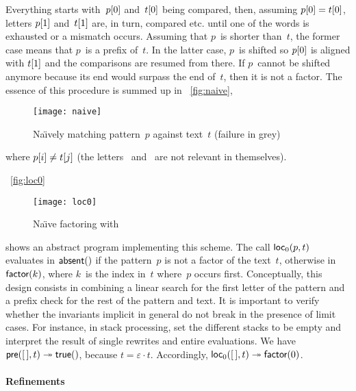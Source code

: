 Everything starts with~\({p}[{0}]\) and~\({t}[{0}]\) being
compared, then, assuming \({p}[{0}] = {t}[{0}]\), letters
\({p}[{1}]\) and~\({t}[{1}]\) are, in turn, compared etc. until
one of the words is exhausted or a mismatch occurs. Assuming that
\(p\)~is shorter than~\(t\), the former case means that \(p\)~is a
prefix of~\(t\). In the latter case, \(p\)~is shifted so
\({p}[{0}]\) is aligned with \({t}[{1}]\) and the comparisons are
resumed from there. If \(p\)~cannot be shifted anymore because its end
would surpass the end of~\(t\), then it is not a factor. The essence
of this procedure is summed up in \fig~\vref{fig:naive},
\begin{figure}[t]
\centering
\texttt{[image: naive]}
\caption{Na\"{\i}vely matching pattern~\(p\) against text~\(t\)
(failure in grey)\label{fig:naive}}
\end{figure}
where \({p}[{i}] \neq {t}[{j}]\) (the letters
~and~ are not relevant in themselves).

%

\Fig~\vref{fig:loc0}
\begin{figure}[t]
\centering 
\texttt{[image: loc0]}
\caption{Na\"{\i}ve factoring with 
\label{fig:loc0}}
\end{figure}
shows an abstract program implementing this scheme. The call
\(\textsf{loc}_0(p,t)\) evaluates in
\(\textsf{absent}()\) if the pattern~\(p\) is not a factor of the
text~\(t\), otherwise in \(\textsf{factor}(k)\), where \(k\)~is the index
in~\(t\) where~\(p\) occurs first. Conceptually, this design consists
in combining a linear search for the first letter of the pattern and a
prefix check for the rest of the pattern and text. It is important to
verify whether the invariants implicit in general do not break in the
presence of limit cases. For instance, in stack processing, set the
different stacks to be empty and interpret the result of single
rewrites and entire evaluations. We have \(\textsf{pre}([\,],t)
\twoheadrightarrow \textsf{true}()\), because \(t = \varepsilon \cdot
t\). Accordingly, \(\textsf{loc}_0([\,],t) \twoheadrightarrow
\textsf{factor}(0)\).

\paragraph{Refinements}

